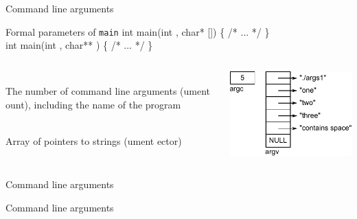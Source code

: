 \documentclass[usenames,dvipsnames,aspectratio=169]{beamer}
\begin{document}
\begin{frame}{Command line arguments}
  \begin{exampleblock}{Formal parameters of \texttt{main}}
    int main(int , char* []) \{ /* ... */ \}\\
    int main(int , char** ) \{ /* ... */ \}
  \end{exampleblock}
  \begin{columns}[T]
      \begin{description}[mm]
        \item[argc] \hfill \\
          The number of command line arguments (ument ount), including the name of the program
        \item[argv] \hfill \\
          Array of pointers to strings (ument ector)
      \end{description}
      \begin{center}
        \includegraphics[width=.9\textwidth]{main.pdf}
      \end{center}
  \end{columns}
\end{frame}

\begin{frame}{Command line arguments}
  \begin{exampleblock}{}
    \footnotesize
    
  \end{exampleblock}
\end{frame}

\begin{frame}{Command line arguments}
  \begin{exampleblock}{}
    \footnotesize
    
  \end{exampleblock}
\end{frame}
\end{document}
